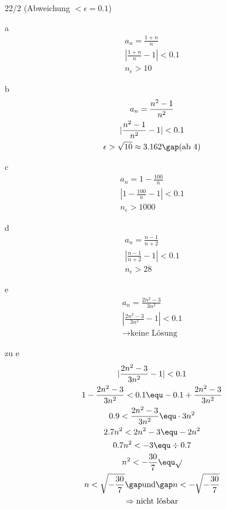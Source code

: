 \begin{exercise}{22/2}
  (Abweichung $< \epsilon = 0.1$)
  \item [a]
  \begin{gather*}
    a_n = \frac{1 + n}{n} \\
    |\frac{1 + n}{n} - 1| < 0.1 \\
    n_\epsilon > 10
  \end{gather*}
  \item [b]
  \begin{gather*}
    a_n = \frac{n^2 - 1}{n^2} \\
    |\frac{n^2 - 1}{n^2} - 1| < 0.1 \\
    \epsilon > \sqrt{10} \approx 3.162\gap \text{(ab 4)}
  \end{gather*}
  \item [c]
  \begin{gather*}
    a_n = 1 - \frac{100}{n} \\
    |1 - \frac{100}{n} - 1| < 0.1 \\
    n_\epsilon > 1000
  \end{gather*}
  \item [d]
  \begin{gather*}
    a_n = \frac{n - 1}{n + 2} \\
    |\frac{n - 1}{n + 2} - 1| < 0.1 \\
    n_\epsilon > 28
  \end{gather*}
  \item [e]
  \begin{gather*}
    a_n = \frac{2n^2 - 3}{3n^2} \\
    |\frac{2n^2 - 3}{3n^2} - 1| < 0.1 \\
    \rightarrow \text{keine Lösung}
  \end{gather*}
  \item [zu e]
  \begin{gather*}
    |\frac{2n^2 - 3}{3n^2} - 1| < 0.1 \\
    1 - \frac{2n^2 - 3}{3n^2} < 0.1 \equ -0.1 + \frac{2n^2 - 3}{3n^2} \\
    0.9 < \frac{2n^2 - 3}{3n^2} \equ \cdot 3n^2 \\
    2.7n^2 < 2n^2 - 3 \equ - 2n^2 \\
    0.7n^2 < -3 \equ \div 0.7 \\
    n^2 < -\frac{30}{7} \equ \sqrt{} \\
    n < \sqrt{-\frac{30}{7}} \gap\text{und}\gap n < -\sqrt{-\frac{30}{7}} \\
    \Rightarrow \text{nicht lösbar}
  \end{gather*}
\end{exercise}
